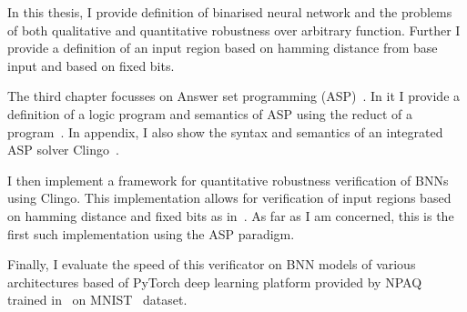 In this thesis, I provide definition of binarised neural network and the problems
of both qualitative and quantitative robustness over arbitrary function.
Further I provide a definition of an input region based on hamming distance from
base input and based on fixed bits.

The third chapter focusses on Answer set programming (ASP)~\cite{lifschitz2008answer,anger2005glimpse}.
In it I provide a definition of a logic program and semantics of ASP using
the reduct of a program~\cite{gelfond1991}.
In appendix, I also show the syntax and semantics of an integrated ASP solver
Clingo~\cite{gebser2019potassco}.

I then implement a framework for quantitative robustness verification of BNNs
using Clingo. This implementation allows for verification of input regions
based on hamming distance and fixed bits as in~\cite{zhang2021bdd4bnn}.
As far as I am concerned, this is the first such implementation using
the ASP paradigm.

Finally, I evaluate the speed of this verificator on BNN models of various
architectures based of PyTorch deep learning platform provided by NPAQ~\cite{baluta2019quantitative}
trained in~\cite{10.1145/3563212} on MNIST~\cite{mnist2017} dataset.
